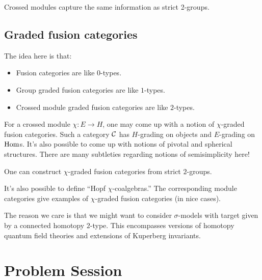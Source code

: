\documentclass{amsart}
\begin{document}
Crossed modules capture the same information as strict 2-groups.

\subsection{Graded fusion categories}

The idea here is that:
\begin{itemize}
  \item Fusion categories are like $0$-types.
  \item Group graded fusion categories are like $1$-types.
  \item Crossed module graded fusion categories are like $2$-types.
\end{itemize}

For a crossed module $\chi: E \to H$, one may come up with a notion of $\chi$-graded fusion categories.
Such a category $\mathcal{C}$ has $H$-grading on objects and $E$-grading on $\operatorname{Hom}$s.
It's also possible to come up with notions of pivotal and spherical structures.
There are many subtleties regarding notions of semisimplicity here!

\begin{ex}
  One can construct $\chi$-graded fusion categories from strict $2$-groups.
\end{ex}

It's also possible to define ``Hopf $\chi$-coalgebras.''
The corresponding module categories give examples of $\chi$-graded fusion categories (in nice cases).

The reason we care is that we might want to consider $\sigma$-models with target given by a connected homotopy $2$-type.
This encompasses versions of homotopy quantum field theories and extensions of Kuperberg invariants.

\section{Problem Session}
\end{document}
